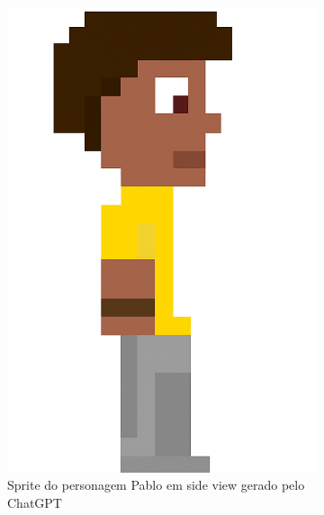 \begin{figure}[htbp]
\begin{subfigure}{0.22 \linewidth}
        \includegraphics[width=1\linewidth]{figs/chatGPT/visao_lateral/res1.png}
        \caption{\small Sprite do personagem Pablo em side view gerado pelo ChatGPT}
        \label{fig:geminiProPabloChatGPTSide}
    \end{subfigure}
    \begin{subfigure}{0.23\linewidth}
        \centering

\end{subfigure}
\end{figure}
